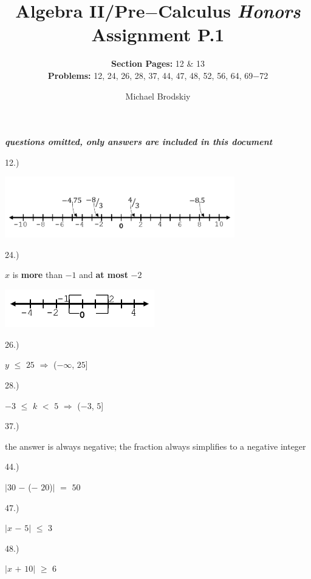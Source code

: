\documentclass[12pt]{article}
\title{\textbf{Algebra II/Pre$-$Calculus \textit{Honors}}  \\ Assignment P.1}
\date{}
\subtitle{\textbf{Section Pages:} 12 \& 13\\\textbf{Problems:} 12, 24, 26, 28, 37, 44, 47, 48, 52, 56, 64, 69$-$72}
\author{Michael Brodskiy}
\begin{document}
\maketitle
\begin{center} \textbf{\textit{questions omitted, only answers are included in this document\\}} \end{center} 
{\setlength{\parindent}{0cm}
12.) 
    \begin{center} \includegraphics[width=100mm]{images/number_line.png} \end{center}
}
{\setlength{\parindent}{0cm}
24.) 
    \begin{center} $x$ is \textbf{more} than $-1$ and \textbf{at most} $-2$ \end{center}
    \begin{center} \includegraphics[width=65mm]{images/line_segment.png} \end{center}
}
{\setlength{\parindent}{0cm}
26.) 
    \begin{center} $y$ $\leq$ $25$ $\Longrightarrow$ ($-\infty$, $25$] \end{center}
}
{\setlength{\parindent}{0cm}
28.)
    \begin{center} $-3$ $\leq$ $k$ $<$ $5$ $\Longrightarrow$ ($-3$, $5$] \end{center}
}
{\setlength{\parindent}{0cm}
37.) 
    \begin{center} the answer is always negative; the fraction always simplifies to a negative integer \end{center}
}
{\setlength{\parindent}{0cm}
44.) 
    \begin{center} $|30$ $-$ ($-$ $20$)$|$ $=$ $50$ \end{center}
}
{\setlength{\parindent}{0cm}
47.) 
    \begin{center} $|x$ $-$ $5|$ $\leq$ $3$ \end{center}
}
{\setlength{\parindent}{0cm}
48.) 
    \begin{center} $|x$ $+$ $10|$ $\geq$ $6$ \end{center}
}
\end{document}
